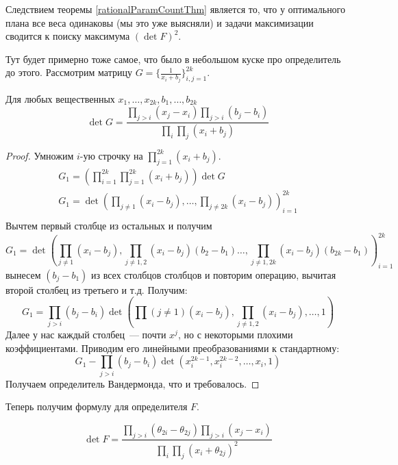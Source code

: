Следствием теоремы \eqref{rationalParamCountThm} является то, что у оптимального плана все веса одинаковы (мы это уже выясняли) и задачи максимизации сводится к поиску максимума $(\det F)^2$.

{\color{blue} Тут будет примерно тоже самое, что было в небольшом куске про определитель до этого.}
Рассмотрим матрицу $G = \{ \frac{1}{x_i + b_j}\}_{i,j = 1}^{2k}$. 
\begin{thm}
Для любых вещественных $x_1, …, x_{2k}, b_1,…, b_{2k}$
$$\det G = \frac{\prod\limits_{j>i} (x_j-x_i) \prod\limits_{j>i}(b_j - b_i)}{\prod\limits_i\prod\limits_j (x_i + b_j)}$$
\end{thm}
\begin{proof}
Умножим $i$-ую строчку на $\prod\limits_{j=1}^{2k}(x_i+b_j)$. 
\begin{equation}
\begin{split}
G_1 = (\prod\limits_{i=1}^{2k}\prod\limits_{j=1}^{2k}(x_i+b_j)) \det G \\
G_1 = \det\left( \prod\limits_{j\neq 1} (x_i-b_j), …, \prod\limits_{j\neq 2k} (x_i-b_j)\right)_{i=1}^{2k}\\
\end{split}
\end{equation}
Вычтем первый столбце из остальных и получим
$$G_1 = \det\left( \prod\limits_{j\neq 1} (x_i-b_j),\prod\limits_{j\neq 1,2} (x_i-b_j) (b_2 - b_1) …, \prod\limits_{j\neq 1, 2k} (x_i-b_j) (b_{2k} - b_1)\right)_{i=1}^{2k}$$
вынесем $(b_j-b_1)$ из всех столбцов столбцов и повторим операцию, вычитая второй столбец из третьего и т.д. Получим:
$$G_1 = \prod\limits_{j>i}(b_j - b_i) \det \left(\prod(j\neq 1)(x_i - b_j), \prod\limits_{j\neq 1,2}(x_i-b_j),…,1\right)$$ 
Далее у нас каждый столбец — почти $x^j$, но с некоторыми плохими коэффициентами. Приводим его линейными преобразованиями к стандартному:
$$G_1 - \prod \limits_{j>i}(b_j - b_i) \det(x_i^{2k-1}, x_i^{2k-2},…, x_i,1)$$
Получаем определитель Вандермонда, что и требовалось.
\end{proof}

Теперь получим формулу для определителя $F$.
\begin{thm}
\begin{equation}
\label{detEquatin}
\det F = \frac{\prod\limits_{j>i}(\theta_{2i}-\theta_{2j})\prod\limits_{j>i}(x_j - x_i)}{\prod\limits_i\prod\limits_j (x_i + \theta_{2j})^2}
\end{equation}
\end{thm}

